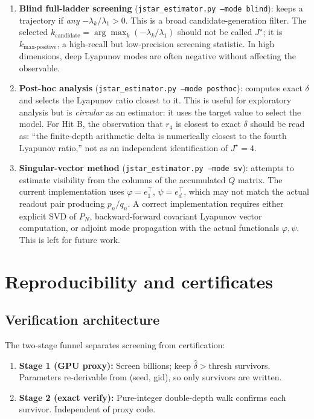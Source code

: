 \documentclass[11pt]{article}
\begin{document}
\begin{enumerate}
\item \textbf{Blind full-ladder screening} (\texttt{jstar\_estimator.py --mode blind}): keeps a trajectory if \emph{any} $-\lambda_k/\lambda_1 > 0$. This is a broad candidate-generation filter. The selected $k_{\mathrm{candidate}} = \arg\max_k (-\lambda_k/\lambda_1)$ should not be called $J^\star$; it is $k_{\mathrm{max\text{-}positive}}$, a high-recall but low-precision screening statistic. In high dimensions, deep Lyapunov modes are often negative without affecting the observable.

\item \textbf{Post-hoc analysis} (\texttt{jstar\_estimator.py --mode posthoc}): computes exact $\delta$ and selects the Lyapunov ratio closest to it. This is useful for exploratory analysis but is \emph{circular} as an estimator: it uses the target value to select the model. For Hit B, the observation that $r_4$ is closest to exact $\delta$ should be read as: ``the finite-depth arithmetic delta is numerically closest to the fourth Lyapunov ratio,'' not as an independent identification of $J^\star = 4$.

\item \textbf{Singular-vector method} (\texttt{jstar\_estimator.py --mode sv}): attempts to estimate visibility from the columns of the accumulated $Q$ matrix. The current implementation uses $\varphi = e_1^\top$, $\psi = e_d^\top$, which may not match the actual readout pair producing $p_n/q_n$. A correct implementation requires either explicit SVD of $P_N$, backward-forward covariant Lyapunov vector computation, or adjoint mode propagation with the actual functionals $\varphi, \psi$. This is left for future work.
\end{enumerate}

\section{Reproducibility and certificates}

\subsection{Verification architecture}

The two-stage funnel separates screening from certification:

\begin{enumerate}
\item \textbf{Stage 1 (GPU proxy):} Screen billions; keep $\hat\delta > \text{thresh}$ survivors. Parameters re-derivable from (seed, gid), so only survivors are written.
\item \textbf{Stage 2 (exact verify):} Pure-integer double-depth walk confirms each survivor. Independent of proxy code.
\end{enumerate}
\end{document}
